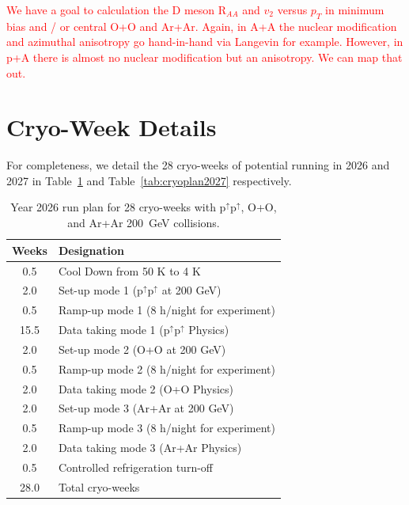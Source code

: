 {\textcolor{red}{We have a goal to calculation the D meson R$_{AA}$ and $v_{2}$ versus $p_T$ in minimum bias and / or central O+O and Ar+Ar.   Again, in A+A the nuclear modification and azimuthal anisotropy go hand-in-hand via Langevin for example.   However, in p+A there is almost no nuclear modification but an anisotropy.   We can map that out.}}

\FloatBarrier

\newpage
\section{Cryo-Week Details}
\label{sec:cryo20262027}

For completeness, we detail the 28 cryo-weeks of potential running in 2026 and 2027 in Table~\ref{tab:cryoplan2026} and Table~\ref{tab:cryoplan2027} respectively.

\begin{table}[hb!]
\centering
\begin{tabular}{ | c | l | }
\hline
Weeks & Designation \\ \hline
0.5  & Cool Down from 50 K to 4 K \\ \hline
2.0  & Set-up mode 1 (p$^{\uparrow}$p$^{\uparrow}$ at 200 GeV) \\ \hline
0.5  & Ramp-up mode 1 (8 h/night for experiment) \\ \hline
15.5 & Data taking mode 1 (p$^{\uparrow}$p$^{\uparrow}$ Physics) \\ \hline
2.0  & Set-up mode 2 (O+O at 200 GeV) \\ \hline
0.5  & Ramp-up mode 2 (8 h/night for experiment) \\ \hline
2.0 & Data taking mode 2 (O+O Physics) \\ \hline
2.0  & Set-up mode 3 (Ar+Ar at 200 GeV) \\ \hline
0.5  & Ramp-up mode 3 (8 h/night for experiment) \\ \hline
2.0 & Data taking mode 3 (Ar+Ar Physics) \\ \hline
0.5  & Controlled refrigeration turn-off \\ \hline \hline \hline
28.0 & Total cryo-weeks \\
\hline
\end{tabular}
\caption{Year 2026 run plan for 28 cryo-weeks with p$^{\uparrow}$p$^{\uparrow}$, O+O, and Ar+Ar 200~GeV collisions.\label{tab:cryoplan2026}}
\end{table}


